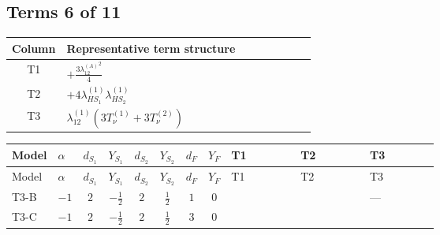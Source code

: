 \documentclass[8pt]{article}
\begin{document}
\begin{landscape}
\subsection*{Terms 6 of 11}
\begin{center}
\begin{tabular}{@{}c >{\raggedright\arraybackslash}p{0.82\linewidth}@{}}
\toprule
Column & Representative term structure \\
\midrule
T1 & \(\displaystyle +\frac{3 {\lambda_{12}^{(A)}}^2}{4}\) \\
\midrule
T2 & \(\displaystyle +4 {\lambda_{HS_1}^{(1)}} {\lambda_{HS_2}^{(1)}}\) \\
\midrule
T3 & \(\displaystyle {\lambda_{12}^{(1)}} (3 T_{\nu}^{(1)}+3 T_{\nu}^{(2)})\) \\
\midrule
\bottomrule
\end{tabular}
\end{center}
\smallskip
\tiny
\begin{longtable}{@{}llcccccc >{\raggedright\arraybackslash}p{0.21\linewidth} >{\raggedright\arraybackslash}p{0.21\linewidth} >{\raggedright\arraybackslash}p{0.21\linewidth}@{}}
\toprule
Model & $\alpha$ & $d_{S_1}$ & $Y_{S_1}$ & $d_{S_2}$ & $Y_{S_2}$ & $d_F$ & $Y_F$ & T1 & T2 & T3 \\
\midrule
\endfirsthead
\toprule
Model & $\alpha$ & $d_{S_1}$ & $Y_{S_1}$ & $d_{S_2}$ & $Y_{S_2}$ & $d_F$ & $Y_F$ & T1 & T2 & T3 \\
\midrule
\endhead
T3-B & $-1$ & $2$ & $-\frac{1}{2}$ & $2$ & $\frac{1}{2}$ & $1$ & $0$ & \scriptsize\adjustbox{max width=\linewidth}{$\begin{gathered} +\frac{3 {\lambda_{12}^{(A)}}^2}{4}\end{gathered}$} & \scriptsize\adjustbox{max width=\linewidth}{$\begin{gathered} +4 {\lambda_{HS_1}^{(1)}} {\lambda_{HS_2}^{(1)}}\end{gathered}$} & --- \\
\midrule
T3-C & $-1$ & $2$ & $-\frac{1}{2}$ & $2$ & $\frac{1}{2}$ & $3$ & $0$ & \scriptsize\adjustbox{max width=\linewidth}{$\begin{gathered} +\frac{3 {\lambda_{12}^{(A)}}^2}{4}\end{gathered}$} & \scriptsize\adjustbox{max width=\linewidth}{$\begin{gathered} +4 {\lambda_{HS_1}^{(1)}} {\lambda_{HS_2}^{(1)}}\end{gathered}$} & \scriptsize\adjustbox{max width=\linewidth}{$\begin{gathered} {\lambda_{12}^{(1)}} (3 T_{\nu}^{(1)}+3 T_{\nu}^{(2)})\end{gathered}$} \\

\end{longtable}
\end{landscape}
\end{document}

